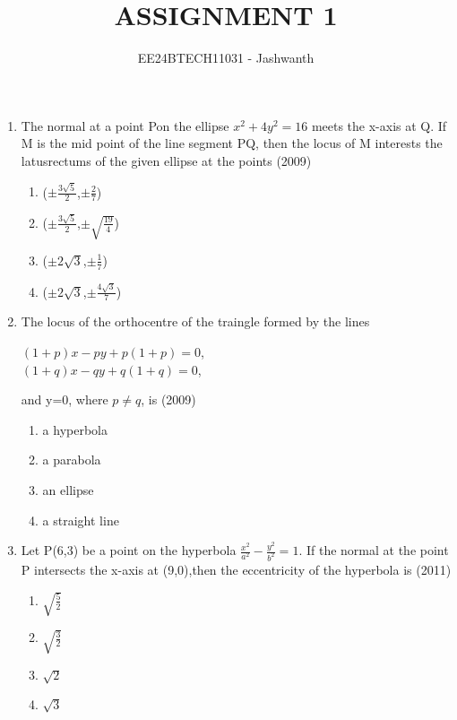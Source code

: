 \documentclass[journal,12pt,twocolumn]{IEEEtran}
\theoremstyle{remark}
\begin{document}

\vspace{3cm}

\title{ASSIGNMENT 1}
\author{EE24BTECH11031 - Jashwanth}
\maketitle
\newpage
\bigskip

\begin{enumerate}
\item The normal at a point Pon the ellipse  $x^2 +4y^2=16$ meets the x-axis at Q. If M is the mid point of the line segment PQ, then the locus of M interests the latusrectums of the given ellipse at the points
	\hfill (2009)
		\begin{enumerate}
			\item ($\pm\frac{3\sqrt{5}}{2}$,$\pm\frac{2}{7}$)
			\item ($\pm\frac{3\sqrt{5}}{2}$,$\pm\sqrt{\frac{19}{4}}$)
			\item ($\pm2\sqrt{3}$,$\pm\frac{1}{7}$)
			\item ($\pm2\sqrt{3}$,$\pm\frac{4\sqrt{3}}{7}$)	
		\end{enumerate}
		
	\item The locus of the orthocentre of the traingle formed by the lines\\
		\begin{center}
		$(1+p)x-py+p(1+p)=0$,\\
		$(1+q)x-qy+q(1+q)=0$,\\
		\end{center}
		and y=0, where $p \neq q$, is
		\hfill(2009)
\begin{enumerate}
	\item a hyperbola
	\item a parabola
	\item an ellipse
	\item a straight line
\end{enumerate}

\item Let P(6,3) be a point on the hyperbola $\frac{x^2}{a^2}-\frac{y^2}{b^2}=1$. If the normal at the point P intersects the x-axis at (9,0),then the eccentricity of the hyperbola is
	\hfill (2011)\\
		\begin{enumerate}
			\item$\sqrt{\frac{5}{2}}$
			\item$\sqrt{\frac{3}{2}}$
			\item$\sqrt{2}$
			\item$\sqrt{3}$
		\end{enumerate}


\end{enumerate}
\end{document}
